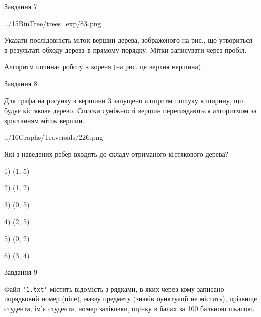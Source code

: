 \documentclass[12pt, ukrainian]{article}
\def\code#1{\Verb!#1!}
\begin{document}
{\newpage
\begin{minipage}[t]{9.7cm}
               
{\begin{center}Завдання {7}\end{center}}
\vspace{-4mm}

\begin{center}
	{../15BinTree/trees_exp/83.png}
\end{center}
Указати послідовність міток вершин дерева, зображеного на рис., що утвориться в результаті обходу дерева в прямому порядку. Мітки записувати через пробіл.\par Алгоритм починає роботу з кореня (на рис. це верхня вершина).\par

\end{minipage}
\vline \hspace{8mm}
\begin{minipage}[t]{8.0cm}
               
{\begin{center}Завдання {8}\end{center}}
\vspace{-4mm}
Для графа на рисунку з вершини 3 запущено алгоритм пошуку в ширину, що будує кістякове дерево. Списки суміжності вершин переглядаються алгоритмом за зростанням міток вершин.\par
\begin{center}
	{../16Graphs/Traversals/226.png}
\end{center}
\par Які з наведених ребер входять до складу отриманого кістякового дерева?\par
1) (1, 5)\par
2) (1, 2)\par
3) (0, 5)\par
4) (2, 5)\par
5) (0, 2)\par
6) (3, 4)\par
{\vskip 15pt} \par

\end{minipage}

               
{\begin{center}Завдання {9}\end{center}}
\vspace{-4mm}
Файл \code{'1.txt'} містить відомість з рядками, в яких через кому записано поряд\-ковий номер (ціле), назву предмету (знаків пунктуації не містить), прізвище студента, ім'я студента, номер заліковки, оцінку в балах за 100 бальною шкалою.

}
\end{document}

